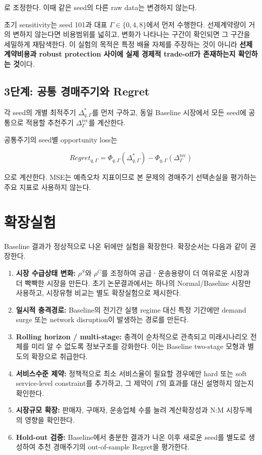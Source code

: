 \documentclass[11pt,a4paper]{article}
\begin{document}
로 조정한다.
이때 같은 seed의 다른 raw data는 변경하지 않는다.

초기 sensitivity는 seed 101과 대표 $\Gamma\in\{0,4,8\}$에서 먼저 수행한다.
선제계약량이 거의 변하지 않는다면 비용범위를 넓히고,
변화가 나타나는 구간이 확인되면 그 구간을 세밀하게 재탐색한다.
이 실험의 목적은 특정 배율 자체를 주장하는 것이 아니라
\textbf{선제계약비용과 robust protection 사이에 실제 경제적 trade-off가 존재하는지 확인하는 것}이다.

\subsection{3단계: 공통 경매주기와 Regret}

각 seed의 개별 최적주기 $\Delta^*_{q,\Gamma}$를 먼저 구하고,
동일 Baseline 시장에서 모든 seed에 공통으로 적용할 추천주기 $\Delta^{\mathrm{rec}}_{\Gamma}$를 계산한다.

공통주기의 seed별 opportunity loss는

\begin{equation}
Regret_{q,\Gamma}
=
\Phi_{q,\Gamma}(\Delta^*_{q,\Gamma})
-
\Phi_{q,\Gamma}(\Delta^{\mathrm{rec}}_{\Gamma})
\end{equation}

으로 계산한다.
MSE는 예측오차 지표이므로 본 문제의 경매주기 선택손실을 평가하는 주요 지표로 사용하지 않는다.

\section{확장실험}

Baseline 결과가 정상적으로 나온 뒤에만 실험을 확장한다.
확장순서는 다음과 같이 권장한다.

\begin{enumerate}
\item \textbf{시장 수급상태 변화:}
$\rho^S$와 $\rho^C$를 조정하여 공급ㆍ운송용량이 더 여유로운 시장과 더 빡빡한 시장을 만든다.
초기 논문결과에서는 하나의 Normal/Baseline 시장만 사용하고,
시장유형 비교는 별도 확장실험으로 제시한다.

\item \textbf{일시적 충격경로:}
Baseline의 전기간 실행 regime 대신 특정 기간에만 demand surge 또는 network disruption이 발생하는 경로를 만든다.

\item \textbf{Rolling horizon / multi-stage:}
충격이 순차적으로 관측되고 미래시나리오 전체를 미리 알 수 없도록 정보구조를 강화한다.
이는 Baseline two-stage 모형과 별도의 확장으로 취급한다.

\item \textbf{서비스수준 제약:}
정책적으로 최소 서비스율이 필요할 경우에만 hard 또는 soft service-level constraint를 추가하고,
그 제약이 $\Gamma$의 효과를 대신 설명하지 않는지 확인한다.

\item \textbf{시장규모 확장:}
판매자, 구매자, 운송업체 수를 늘려 계산확장성과 N:M 시장두께의 영향을 확인한다.

\item \textbf{Hold-out 검증:}
Baseline에서 충분한 결과가 나온 이후 새로운 seed를 별도로 생성하여
추천 경매주기의 out-of-sample Regret을 평가한다.
\end{enumerate}
\end{document}
